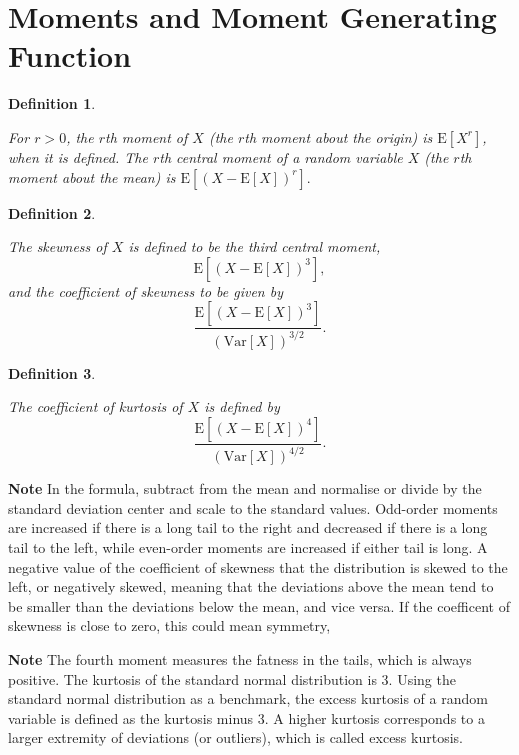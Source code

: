 \documentclass[
]{book}
\theoremstyle{definition}
\newtheorem{definition}{Definition}[chapter]
\theoremstyle{definition}
\theoremstyle{definition}
\theoremstyle{definition}
\theoremstyle{remark}
\begin{document}
\hypertarget{moments-and-moment-generating-function}{%
\section{Moments and Moment Generating Function}\label{moments-and-moment-generating-function}}

\begin{definition}
\protect\hypertarget{def:unlabeled-div-12}{}\label{def:unlabeled-div-12}

\emph{For \(r > 0\), the \(r\)th moment of \(X\) (the \(r\)th
moment about the origin) is \(\mathrm{E}[X^r]\), when it is defined. The
\(r\)th central moment of a random variable \(X\) (the \(r\)th moment about
the mean) is \(\mathrm{E}[(X - \mathrm{E}[X])^r].\) }

\end{definition}

\begin{definition}
\protect\hypertarget{def:unlabeled-div-13}{}\label{def:unlabeled-div-13}

\emph{The skewness of \(X\) is defined to be the third
central moment, \[\mathrm{E}[(X - \mathrm{E}[X])^3],\] and the
coefficient of skewness to be given by
\[\frac{\mathrm{E}[(X - \mathrm{E}[X])^3]}{(\mathrm{Var}[X])^{3/2}}.\] }

\end{definition}

\begin{definition}
\protect\hypertarget{def:unlabeled-div-14}{}\label{def:unlabeled-div-14}

\emph{The coefficient of kurtosis of \(X\) is defined by
\[\frac{\mathrm{E}[(X - \mathrm{E}[X])^4]}{(\mathrm{Var}[X])^{4/2}}.\] }

\end{definition}

\textbf{Note} In the formula, subtract from the mean and normalise or divide by the standard deviation center and scale to the standard values. Odd-order moments are increased if there is a long tail to the right and decreased if there is a long tail to the left, while even-order moments are increased if either tail is long. A negative value of the coefficient of skewness that the distribution is skewed to the left, or negatively skewed, meaning that the deviations above the mean tend to be smaller than the deviations below the mean, and vice versa. If the coefficent of skewness is close to zero, this could mean symmetry,

\textbf{Note} The fourth moment measures the fatness in the tails, which is always positive. The kurtosis of the standard normal distribution is 3. Using the standard normal distribution as a benchmark, the excess kurtosis of a random variable is defined as the kurtosis minus 3. A higher kurtosis corresponds to a larger extremity of deviations (or outliers), which is called excess kurtosis.
\end{document}
